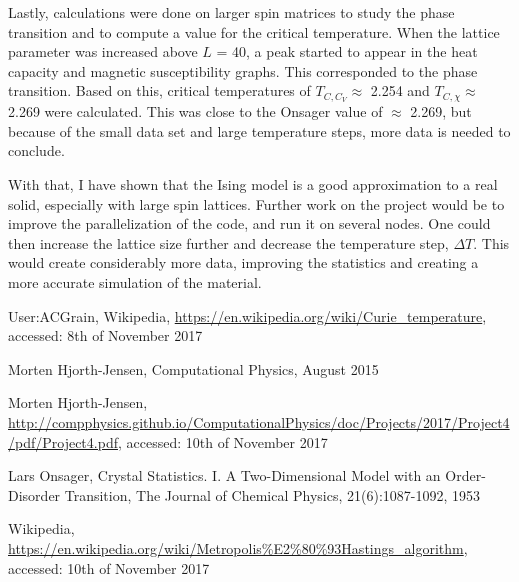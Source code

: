 \documentclass[10pt,a4paper,titlepage]{article}
\begin{document}
Lastly, calculations were done on larger spin matrices to study the phase transition and to compute a value for the critical temperature. When the lattice parameter was increased above $L$ = 40, a peak started to appear in the heat capacity and magnetic susceptibility graphs. This corresponded to the phase transition. Based on this, critical temperatures of $T_{C,C_{V}} \approx$ 2.254 and $T_{C, \chi} \approx$ 2.269 were calculated. This was close to the Onsager value of $\approx$ 2.269, but because of the small data set and large temperature steps, more data is needed to conclude. 

With that, I have shown that the Ising model is a good approximation to a real solid, especially with large spin lattices. Further work on the project would be to improve the parallelization of the code, and run it on several nodes. One could then increase the lattice size further and decrease the temperature step, $\Delta T$. This would create considerably more data, improving the statistics and creating a more accurate simulation of the material. 



\begin{flushleft}
\begin{thebibliography}{}

\singlespacing
\small

  User:ACGrain,
  Wikipedia,
  \url{https://en.wikipedia.org/wiki/Curie_temperature},
  accessed: 8th of November 2017

  Morten Hjorth-Jensen,
  Computational Physics,
  August 2015

  Morten Hjorth-Jensen,
  \url{http://compphysics.github.io/ComputationalPhysics/doc/Projects/2017/Project4/pdf/Project4.pdf},
  accessed: 10th of November 2017


  Lars Onsager,
  Crystal Statistics. I. A Two-Dimensional Model with an Order-Disorder Transition,
  The Journal of Chemical Physics,
  21(6):1087-1092,
  1953

  Wikipedia,
  \url{https://en.wikipedia.org/wiki/Metropolis%E2%80%93Hastings_algorithm},
  accessed: 10th of November 2017  
  

  
\end{thebibliography}
\end{flushleft}
\end{document}
